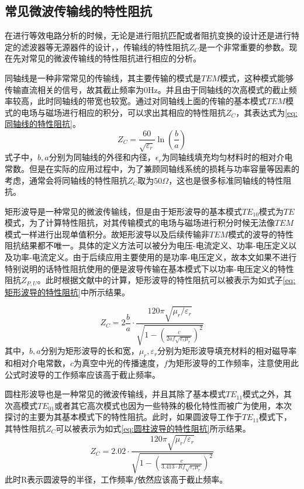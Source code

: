 \documentclass[master]{thesis-uestc}
\begin{document}
\subsection{常见微波传输线的特性阻抗}
在进行等效电路分析的时候，无论是进行阻抗匹配或者阻抗变换的设计还是进行特定的滤波器等无源器件的设计，，传输线的特性阻抗\(Z_C\)是一个非常重要的参数。现在先对常见的微波传输线的特性阻抗进行相应的分析。

同轴线是一种非常常见的传输线，其主要传输的模式是\(TEM\)模式，这种模式能够传输直流相关的信号，故其截止频率为0Hz。并且由于同轴线的次高模式的截止频率较高，此时同轴线的带宽也较宽。通过对同轴线上面的传输的基本模式\(TEM\)模式的电场与磁场进行相应的积分，可以求出其相应的特性阻抗\(Z_C\)，其表达式为\ref{eq:同轴线的特性阻抗}。
\begin{equation}\label{eq:同轴线的特性阻抗}
    Z_C = \frac{60}{\sqrt{\varepsilon_r}} \ln \left( \frac{b}{a} \right)
\end{equation}
式子中，\(b, a\)分别为同轴线的外径和内径，\(\epsilon_r\)为同轴线填充均匀材料时的相对介电常数。但是在实际的应用过程中，为了兼顾同轴线系统的损耗与功率容量等因素的考虑，通常会将同轴线的特性阻抗\(Z_C\)取为\(50 \Omega\)，这也是很多标准同轴线的特性阻抗。

矩形波导是一种常见的微波传输线，但是由于矩形波导的基本模式\(TE_{10}\)模式为\(TE\)模式，为了计算特性阻抗，对其传输模式的电场与磁场进行积分时候无法像\(TEM\)模式一样进行出现单值积分。故矩形波导以及后续传输非\(TEM\)模式的波导的特性阻抗结果都不唯一。具体的定义方法可以被分为电压-电流定义、功率-电压定义以及功率-电流定义。由于后续应用主要使用的是功率-电压定义，故本文如果不进行特别说明的话特性阻抗使用的便是波导传输在基本模式下以功率-电压定义的特性阻抗\(Z_{P, U}\)。此时根据文献\cite{heihil_characteristic_2006}中的计算，矩形波导的特性阻抗可以被表示为如式子\ref{eq:矩形波导的特性阻抗}中所示结果。

\begin{equation}\label{eq:矩形波导的特性阻抗}
    Z_{C}=  2\frac{b}{a} \cdot \frac{120 \pi \sqrt{\mu_r / \varepsilon_r}}{\sqrt{1 - \left( \frac{c}{2af \sqrt{\varepsilon_r \mu_r}} \right)^2}} 
\end{equation}
其中，\(b, a\)分别为矩形波导的长和宽，\(\mu_r, \varepsilon_r\)分别为矩形波导填充材料的相对磁导率和相对介电常数，\(c\)为真空中光的传播速度，\(f\)为矩形波导的工作频率，注意使用此公式时波导的工作频率应该高于截止频率。

圆柱形波导也是一种常见的微波传输线，并且其除了基本模式\(TE_{11}\)模式之外，其次高模式\(TE_{01}\)或者其它高次模式也因为一些特殊的极化特性而被广为使用，本次探讨的主要为其基本模式下的特性阻抗。此时，如果圆波导工作于\(TE_{11}\)模式下，其特性阻抗\(Z_C\)可以被表示为如式\ref{eq:圆柱波导的特性阻抗}所示结果。
\begin{equation}\label{eq:圆柱波导的特性阻抗}
    Z_{C}= 2.02 \cdot \frac{120 \pi \sqrt{\mu_r / \varepsilon_r}}{\sqrt{1 - \left( \frac{c}{3.413 \cdot Rf \sqrt{\varepsilon_r \mu_r}} \right)^2}} 
\end{equation}
此时R表示圆波导的半径，工作频率\(f\)依然应该高于截止频率。
\end{document}
